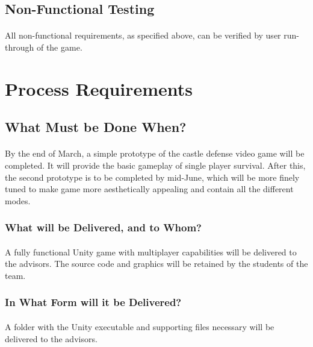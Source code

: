 \subsection{Non-Functional Testing}

\paragraph{} All non-functional requirements, as specified above, can be verified by user run-through of the game.

\section{Process Requirements}

\subsection{What Must be Done When?}

\paragraph{} By the end of March, a simple prototype of the castle defense video game will be completed. It will provide the basic gameplay of single player survival. After this, the second prototype is to be completed by mid-June, which will be more finely tuned to make game more aesthetically appealing and contain all the different modes.

\subsubsection{What will be Delivered, and to Whom?}

\paragraph{} A fully functional Unity game with multiplayer capabilities will be delivered to the advisors. The source code and graphics will be retained by the students of the team.

\subsubsection{In What Form will it be Delivered?}

\paragraph{} A folder with the Unity executable and supporting files necessary will be delivered to the advisors.

